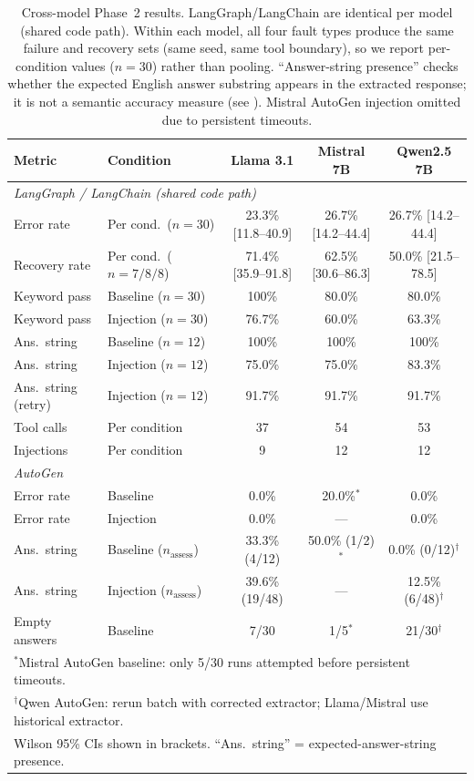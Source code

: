 \documentclass[make,article,submit,moreauthors,pdftex]{mdpi}
\begin{document}
\begin{table}[H]
\caption{Cross-model Phase~2 results. LangGraph/LangChain are identical per model (shared code path). Within each model, all four fault types produce the same failure and recovery sets (same seed, same tool boundary), so we report per-condition values ($n = 30$) rather than pooling. ``Answer-string presence'' checks whether the expected English answer substring appears in the extracted response; it is not a semantic accuracy measure (see ). Mistral AutoGen injection omitted due to persistent timeouts.}\label{tab:cross-model-phase2}
\centering
\footnotesize
\begin{tabular}{llccc}
\toprule
\textbf{Metric} & \textbf{Condition} & \textbf{Llama 3.1} & \textbf{Mistral 7B} & \textbf{Qwen2.5 7B} \\
\midrule
\multicolumn{5}{l}{\textit{LangGraph / LangChain (shared code path)}} \\
Error rate & Per cond.\ ($n\!=\!30$) & 23.3\% [11.8--40.9] & 26.7\% [14.2--44.4] & 26.7\% [14.2--44.4] \\
Recovery rate & Per cond.\ ($n\!=\!7/8/8$) & 71.4\% [35.9--91.8] & 62.5\% [30.6--86.3] & 50.0\% [21.5--78.5] \\
Keyword pass & Baseline ($n\!=\!30$) & 100\% & 80.0\% & 80.0\% \\
Keyword pass & Injection ($n\!=\!30$) & 76.7\% & 60.0\% & 63.3\% \\
Ans.\ string & Baseline ($n\!=\!12$) & 100\% & 100\% & 100\% \\
Ans.\ string & Injection ($n\!=\!12$) & 75.0\% & 75.0\% & 83.3\% \\
Ans.\ string (retry) & Injection ($n\!=\!12$) & 91.7\% & 91.7\% & 91.7\% \\
Tool calls & Per condition & 37 & 54 & 53 \\
Injections & Per condition & 9 & 12 & 12 \\
\midrule
\multicolumn{5}{l}{\textit{AutoGen}} \\
Error rate & Baseline & 0.0\% & 20.0\%$^*$ & 0.0\% \\
Error rate & Injection & 0.0\% & --- & 0.0\% \\
Ans.\ string & Baseline ($n_{\text{assess}}$) & 33.3\% (4/12) & 50.0\% (1/2)$^*$ & 0.0\% (0/12)$^\dagger$ \\
Ans.\ string & Injection ($n_{\text{assess}}$) & 39.6\% (19/48) & --- & 12.5\% (6/48)$^\dagger$ \\
Empty answers & Baseline & 7/30 & 1/5$^*$ & 21/30$^\dagger$ \\
\bottomrule
\multicolumn{5}{l}{\footnotesize $^*$Mistral AutoGen baseline: only 5/30 runs attempted before persistent timeouts.} \\
\multicolumn{5}{l}{\footnotesize $^\dagger$Qwen AutoGen: rerun batch with corrected extractor; Llama/Mistral use historical extractor.} \\
\multicolumn{5}{l}{\footnotesize Wilson 95\% CIs shown in brackets. ``Ans.\ string'' = expected-answer-string presence.} \\
\end{tabular}
\end{table}
\end{document}
